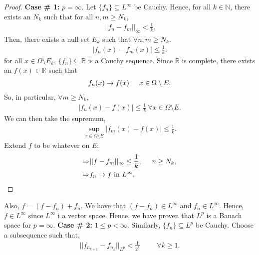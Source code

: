 \documentclass[psamsfonts]{amsart}
\theoremstyle{definition}
\theoremstyle{remark}
\newcommand{\R}[0]{\mathbb{R}}
\numberwithin{equation}{section}
\begin{document}
\begin{proof}
	\textbf{Case \# 1:} \( p = \infty \). Let \( \{ f_n \} \subseteq L^\infty \) be Cauchy. Hence, for all \( k \in \mathbb{N} \), there exists an \( N_k \) such that for all \( n, m \geq N_k \), 
	\begin{align}
		|| f_n - f_m ||_\infty < \frac{1}{k}. 
	\end{align}
	Then, there exists a null set \( E_k \) such that \( \forall n,m \geq N_k \). 
	\begin{align*}
		|f_n(x) - f_m(x) | \leq \frac{1}{k}.
	\end{align*} 
	for all \( x \in \Omega \setminus E_k \), \( \{ f_n \} \subseteq \R \) is a Cauchy sequence. Since \( \R \) is complete, there exists an \( f(x) \in \R \) such that		
	\begin{align*} 
		f_n(x) \rightarrow f(x) \hspace{0.5cm} x \in \Omega \setminus E.
	\end{align*} 
	 So, in particular, \( \forall m \geq N_k \),
	 \begin{align*}
	 		| f_n(x) - f(x) | \leq \frac{1}{k}\ \forall x \in \Omega \setminus E. 
	 \end{align*}
	 We can then take the supremum, 
	 \begin{align*}
	 	\sup_{ x \in \Omega \setminus E } |f_m(x) - f(x) | \leq \frac{1}{k}. 
	 \end{align*}
	 Extend \( f \) to be whatever on \( E \): 
	 \begin{align*}
	 	\Rightarrow & || f - f_m ||_\infty \leq \frac{1}{k}, \hspace{0.5cm} n \geq N_k, \\
	 	\Rightarrow &  f_n \rightarrow f \text{ in } L^\infty. 
	 \end{align*}
\end{proof}
Also, \( f = (f - f_n) + f_n \). We have that \( (f - f_n) \in L^\infty \) and \( f_n \in L^\infty \). Hence, \( f \in L^\infty \) since \( L^\infty \) i a vector space. Hence, we have proven that \(L^p \) is a Banach space for \( p = \infty \).
\newline
\newline
\textbf{Case \# 2:} \( 1 \leq p < \infty \).  Similarly, \( \{ f_n \} \subseteq L^p \) be Cauchy. Choose a subsequence such that, 
\begin{align*} 
	||f_{n_{k+1}} - f_{n_k} ||_{L^p} < \frac{1}{2^k} \hspace{1cm} \forall k \geq 1.
\end{align*}
\end{document}
